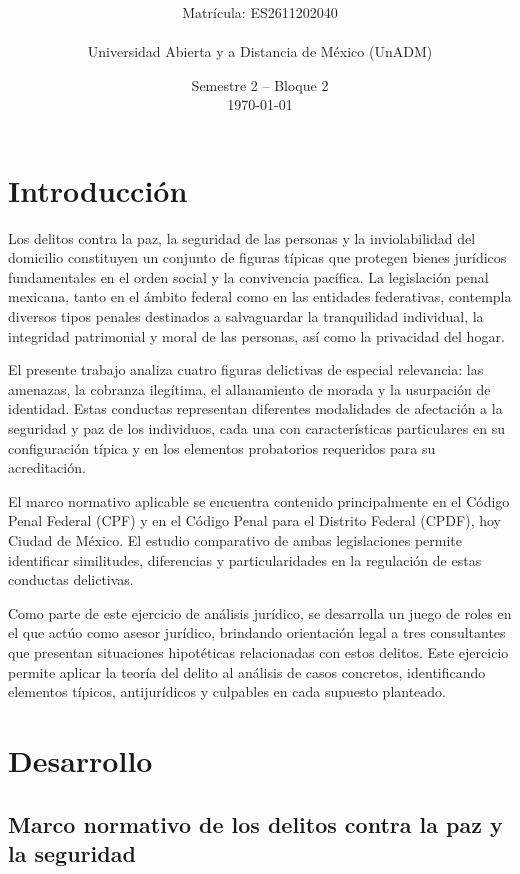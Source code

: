 \documentclass[12pt,letterpaper]{article}
\title{\textbf{\documenttitle}}
\author{
    \documentauthor\\
    \small Matrícula: ES2611202040\\
    \small \documentsubject\\
    \small Universidad Abierta y a Distancia de México (UnADM)
}
\date{\small Semestre 2 -- Bloque 2\\[0.5em] \today}
\begin{document}
\maketitle
\thispagestyle{fancy}

\vspace{1em}

\section{Introducción}

Los delitos contra la paz, la seguridad de las personas y la inviolabilidad del domicilio constituyen un conjunto de figuras típicas que protegen bienes jurídicos fundamentales en el orden social y la convivencia pacífica. La legislación penal mexicana, tanto en el ámbito federal como en las entidades federativas, contempla diversos tipos penales destinados a salvaguardar la tranquilidad individual, la integridad patrimonial y moral de las personas, así como la privacidad del hogar.

El presente trabajo analiza cuatro figuras delictivas de especial relevancia: las amenazas, la cobranza ilegítima, el allanamiento de morada y la usurpación de identidad. Estas conductas representan diferentes modalidades de afectación a la seguridad y paz de los individuos, cada una con características particulares en su configuración típica y en los elementos probatorios requeridos para su acreditación.

El marco normativo aplicable se encuentra contenido principalmente en el Código Penal Federal (CPF) y en el Código Penal para el Distrito Federal (CPDF), hoy Ciudad de México. El estudio comparativo de ambas legislaciones permite identificar similitudes, diferencias y particularidades en la regulación de estas conductas delictivas.

Como parte de este ejercicio de análisis jurídico, se desarrolla un juego de roles en el que actúo como asesor jurídico, brindando orientación legal a tres consultantes que presentan situaciones hipotéticas relacionadas con estos delitos. Este ejercicio permite aplicar la teoría del delito al análisis de casos concretos, identificando elementos típicos, antijurídicos y culpables en cada supuesto planteado.


\section{Desarrollo}

\subsection{Marco normativo de los delitos contra la paz y la seguridad}
\end{document}
